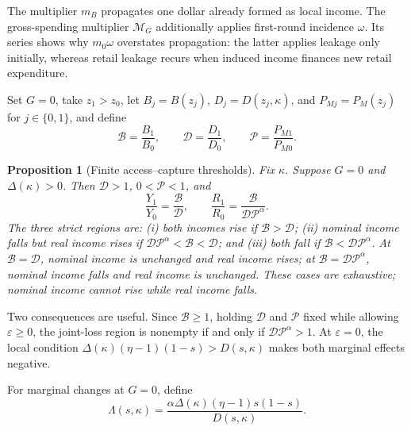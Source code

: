 \documentclass[11pt]{article}
\theoremstyle{plain}
\newtheorem{proposition}{Proposition}
\theoremstyle{definition}
\begin{document}
The multiplier \(m_B\) propagates one dollar already formed as local income.
The gross-spending multiplier \(\mathcal M_G\) additionally applies first-round
incidence \(\omega\). Its series shows why \(m_0\omega\) overstates propagation:
the latter applies leakage only initially, whereas retail leakage recurs when
induced income finances new retail expenditure.

Set \(G=0\), take \(z_1>z_0\), let
\(B_j=B(z_j)\), \(D_j=D(z_j,\kappa)\), and
\(P_{Mj}=P_M(z_j)\) for \(j\in\{0,1\}\), and define
\begin{equation}
 \mathcal B=\frac{B_1}{B_0},\qquad
 \mathcal D=\frac{D_1}{D_0},\qquad
 \mathcal P=\frac{P_{M1}}{P_{M0}}.
 \label{eq:finite-objects}
\end{equation}

\begin{proposition}[Finite access--capture thresholds]
\label{prop:thresholds}
Fix \(\kappa\). Suppose \(G=0\) and \(\Delta(\kappa)>0\). Then
\(\mathcal D>1\), \(0<\mathcal P<1\), and
\begin{equation}
 \frac{Y_1}{Y_0}=\frac{\mathcal B}{\mathcal D},\qquad
 \frac{R_1}{R_0}=
 \frac{\mathcal B}{\mathcal D\mathcal P^\alpha}.
 \label{eq:finite-ratios}
\end{equation}
The three strict regions are: (i) both incomes rise if
\(\mathcal B>\mathcal D\); (ii) nominal income falls but real income rises if
\(\mathcal D\mathcal P^\alpha<\mathcal B<\mathcal D\); and (iii) both fall if
\(\mathcal B<\mathcal D\mathcal P^\alpha\). At
\(\mathcal B=\mathcal D\), nominal income is unchanged and real income rises;
at \(\mathcal B=\mathcal D\mathcal P^\alpha\), nominal income falls and real
income is unchanged. These cases are exhaustive; nominal income cannot rise
while real income falls.
\end{proposition}

Two consequences are useful. Since \(\mathcal B\geq1\), holding
\(\mathcal D\) and \(\mathcal P\) fixed
while allowing \(\varepsilon\geq0\), the joint-loss region is nonempty if and
only if \(\mathcal D\mathcal P^\alpha>1\). At
\(\varepsilon=0\), the local condition
\(\Delta(\kappa)(\eta-1)(1-s)>D(s,\kappa)\) makes both marginal effects
negative.

For marginal changes at \(G=0\), define
\begin{equation}
 \Lambda(s,\kappa)=
 \frac{\alpha\Delta(\kappa)(\eta-1)s(1-s)}
 {D(s,\kappa)}.
 \label{eq:substitution-drag}
\end{equation}
\end{document}
